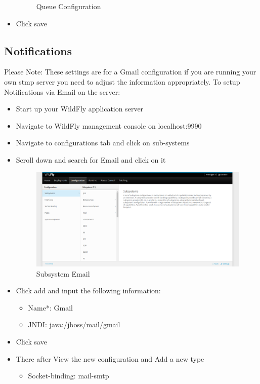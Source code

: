 \documentclass[11pt,a4paper]{article}
\begin{document}
\begin{itemize}
\begin{figure}[H]
\begin{center}
			\caption{Queue Configuration}
		\end{center}
	\end{figure}
	
	\item Click save \\
\end{itemize}

\subsection{Notifications}
Please Note: These settings are for a Gmail configuration if you are running your own stmp server you need to adjust the information appropriately. 
To setup Notifications via Email on the server: \\
\begin{itemize}
	\item Start up your WildFly application server
	\item Navigate to WildFly management console on localhost:9990
	\item Navigate to configurations tab and click on sub-systems
	\item Scroll down and search for Email and click on it
	\begin{figure}[H]
		\begin{center}
			\includegraphics[width=0.6\linewidth]{../Images/subsystem}
			\caption{Subsystem Email}
		\end{center}
	\end{figure}
	\item Click add and input the following information:
	\begin{itemize}
		\item Name*: Gmail 
		\item JNDI: java:/jboss/mail/gmail
	\end{itemize}
	\item Click save \\
	\item There after View the new configuration and Add a new type
	\begin{itemize}
		\item Socket-binding: mail-smtp

\end{itemize}
\end{itemize}
\end{document}
